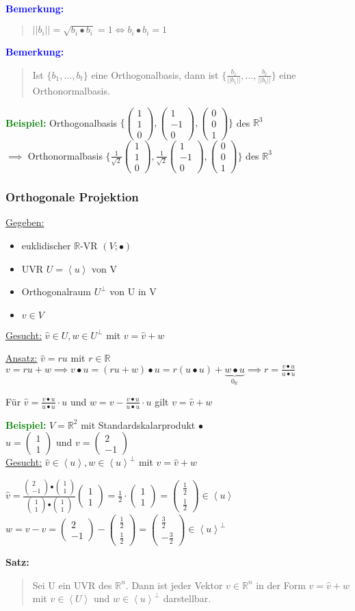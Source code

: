 \documentclass{article}
\newcommand{\blue}[1]{\textcolor{blue}{#1}}
\newcommand{\green}[1]{\textcolor{green}{#1}}
\newcommand{\dgr}[1]{\textcolor{dgr}{#1}}
\newcommand{\ex}{\green{\textbf{Beispiel: }}}
\newcommand{\an}[1]{\blue{\textbf{Bemerkung: }}\begin{quote}#1\end{quote}}
\newcommand{\se}[1]{\dgr{\textbf{Satz: }}\begin{quote}#1\end{quote}}
\newcommand{\R}{\mathbb{R}}
\newcommand{\no}[1]{||#1||}
\newcommand{\vvec}[2]{\begin{pmatrix}#1\\#2\end{pmatrix}}
\newcommand{\vvvec}[3]{\begin{pmatrix}#1\\#2\\#3\end{pmatrix}}
\newcommand{\spann}[1]{\left\langle#1\right\rangle}
\begin{document}
\an{
    $\no{b_i} = \sqrt{b_i \bullet b_i} = 1 \iff b_i \bullet b_i = 1$
}

\an{
    Ist $\{b_1, \dots, b_t\}$ eine Orthogonalbasis, dann ist $\{\frac{b_1}{\no{b_1}}, \dots, \frac{b_t}{\no{b_t}}\}$ eine Orthonormalbasis.
}

\ex Orthogonalbasis $\{\vvvec{1}{1}{0}, \vvvec{1}{-1}{0}, \vvvec{0}{0}{1}\}$ des $\R^3$\\
$\implies$ Orthonormalbasis $\{\frac{1}{\sqrt{2}}\vvvec{1}{1}{0}, \frac{1}{\sqrt{2}}\vvvec{1}{-1}{0}, \vvvec{0}{0}{1}\}$ des $\R^3$

\subsubsection{Orthogonale Projektion}

\underline{Gegeben:} \begin{itemize}
    \item euklidischer $\R$-VR $(V; \bullet)$
    \item UVR $U = \spann{u}$ von V
    \item Orthogonalraum $U^{\perp}$ von U in V
    \item $v \in V$
\end{itemize}
\underline{Gesucht:} $\hat{v} \in U, w \in U^{\perp}$ mit $v = \hat{v} + w$

\underline{Ansatz:} $\hat{v} = ru$ mit $r \in \R$\\
$v = ru + w \implies v \bullet u = (ru + w) \bullet u = r(u \bullet u) + \underbrace{w \bullet u}_{0_{\R}} \implies r = \frac{v \bullet u}{u \bullet u}$

Für $\hat{v} = \frac{v \bullet u}{u \bullet u} \cdot u$ und $w = v - \frac{v \bullet u}{u \bullet u} \cdot u$ gilt $v = \hat{v} + w$

\newpage
\ex $V = \R^2$ mit Standardskalarprodukt $\bullet$\\
$u = \vvec{1}{1}$ und $v = \vvec{2}{-1}$\\
\underline{Gesucht:} $\hat{v} \in \spann{u}, w \in \spann{u}^{\perp}$ mit $v = \hat{v} + w$

$\hat{v} = \frac{\vvec{2}{-1} \bullet \vvec{1}{1}}{\vvec{1}{1} \bullet \vvec{1}{1}} \vvec{1}{1} = \frac{1}{2} \cdot \vvec{1}{1} = \vvec{\frac{1}{2}}{\frac{1}{2}} \in \spann{u}$\\
$w = v - \hat{v} = \vvec{2}{-1} - \vvec{\frac{1}{2}}{\frac{1}{2}} = \vvec{\frac{3}{2}}{-\frac{3}{2}} \in \spann{u}^{\perp}$

\se{
    Sei U ein UVR des $\R^n$. Dann ist jeder Vektor $v \in \R^n$ in der Form $v = \hat{v} + w$ mit $v \in \spann{U}$ und $w \in \spann{u}^{\perp}$ darstellbar.
}
\end{document}
